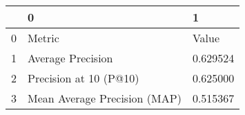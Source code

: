\begin{tabular}{lll}
\toprule
 & 0 & 1 \\
\midrule
0 & Metric & Value \\
1 & Average Precision & 0.629524 \\
2 & Precision at 10 (P@10) & 0.625000 \\
3 & Mean Average Precision (MAP) & 0.515367 \\
\bottomrule
\end{tabular}
